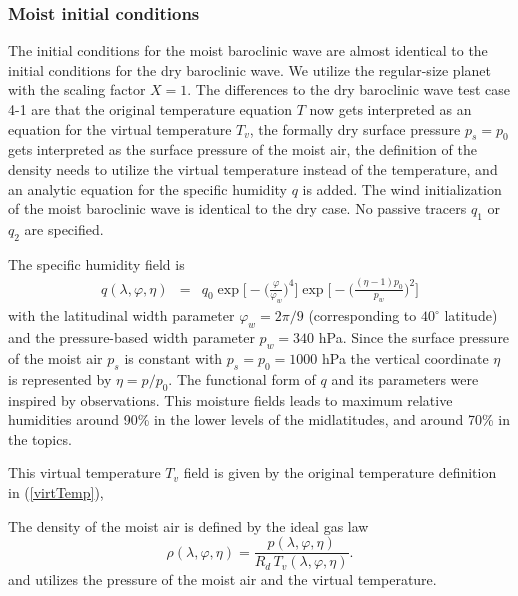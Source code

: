 \documentclass[times,doublespace]{fldauth}
\begin{document}
\subsubsection*{Moist initial conditions}
The initial conditions for the moist baroclinic wave are almost identical to the initial conditions for the dry baroclinic wave. We utilize the regular-size planet with the scaling factor $X=1$. The differences to the dry baroclinic wave test case 4-1 are that the original temperature equation $T$ now gets interpreted as an equation for the virtual temperature $T_v$, the formally dry surface pressure $p_s = p_0$ gets interpreted as the surface pressure of the moist air, the definition of the density needs to utilize the virtual temperature instead of the temperature, and an analytic equation for the specific humidity $q$ is added. The wind initialization of the moist baroclinic wave is identical to the dry case. No passive tracers $q_1$  or $q_2$ are specified.

The specific humidity field is 
\begin{eqnarray}
q(\lambda, \varphi, \eta) &=& q_0 \exp\Bigg[- \Big(\frac{\varphi}{\varphi_{w}}\Big)^4 \Bigg] \exp\Bigg[- \Bigg(\frac{(\eta-1)p_0}{p_{w}}\Bigg)^2  \Bigg]
\end{eqnarray}
with the latitudinal width parameter $\varphi_{w} = 2 \pi / 9$ (corresponding to $40^\circ$ latitude) and the pressure-based width parameter $p_w = 340$ hPa. Since the surface pressure of the moist air $p_s$ is constant with $p_s = p_0 = 1000$ hPa  the vertical coordinate $\eta$ is represented by $\eta = p/p_0$. The functional form of $q$ and its parameters were inspired by observations. This moisture fields leads to maximum relative humidities around 90\% in the lower levels of the midlatitudes, and around 70\% in the topics.

This virtual temperature $T_v$ field is given by the original temperature definition in (\ref{virtTemp}),

The density of the moist air is defined by the ideal gas law
\begin{equation} \label{eq:density_test4m}
\rho(\lambda, \varphi, \eta) = \frac{p(\lambda, \varphi, \eta)}{R_d \,T_v(\lambda, \varphi, \eta)}.
\end{equation} 
and utilizes the pressure of the moist air and the virtual temperature.
\end{document}
